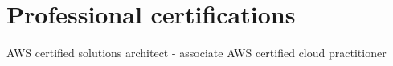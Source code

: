 \section{Professional certifications}
{%
}
{%
	AWS certified solutions architect - associate}
{}
{%
}
{%
	AWS certified cloud practitioner}
{}

